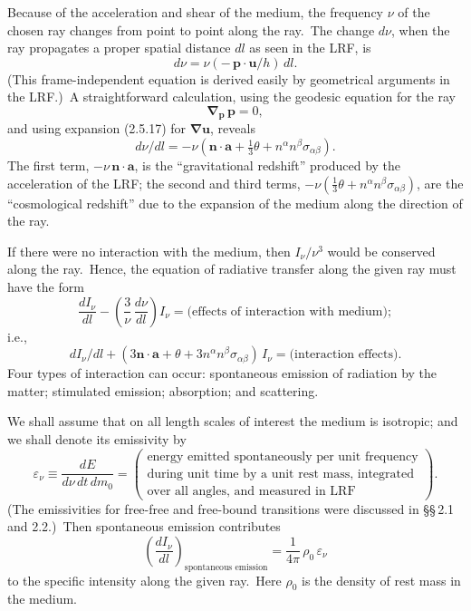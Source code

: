 Because of the acceleration and shear of the medium, the frequency
$\nu$ of the chosen ray changes from point to point along the ray.\ The change $d\nu$,
when the ray propagates a proper spatial distance $dl$ as seen in the LRF, is
%
\begin{equation}
d\nu = \nu(-\,\mathbf{p} \cdot \mathbf{u}/h)\,dl.
\tag{2.6.13}
\end{equation}
%
(This frame-independent equation is derived easily by geometrical arguments
in the LRF.)\ A straightforward calculation, using the geodesic equation for the
ray
%
\[
\boldsymbol{\nabla}_{\mathbf{p}}\,\mathbf{p} = 0,
\]
%
and using expansion (2.5.17) for $\boldsymbol{\nabla}\mathbf{u}$, reveals
%
\begin{equation}
d\nu/dl = -\nu(\mathbf{n} \cdot \mathbf{a} + \tfrac{1}{3}\theta
  + n^\alpha n^\beta \sigma_{\alpha\beta}).
\tag{2.6.14}
\end{equation}
%
The first term, $-\nu\,\mathbf{n} \cdot \mathbf{a}$, is the ``gravitational redshift'' produced by the acceleration
of the LRF; the second and third terms, $-\nu(\tfrac{1}{3}\theta + n^\alpha n^\beta \sigma_{\alpha\beta})$, are the
``cosmological redshift'' due to the expansion of the medium along the direction
of the ray.

If there were no interaction with the medium, then $I_\nu/\nu^3$ would be conserved
along the ray.\ Hence, the equation of radiative transfer along the given ray must
have the form
%
\begin{equation}
\frac{dI_\nu}{dl} - \left(\frac{3}{\nu}\,\frac{d\nu}{dl}\right) I_\nu
  = \text{(effects of interaction with medium)};
\tag{2.6.15}
\end{equation}
%
i.e.,
%
\[
dI_\nu/dl + (3\mathbf{n} \cdot \mathbf{a} + \theta
  + 3n^\alpha n^\beta \sigma_{\alpha\beta})\,I_\nu
  = \text{(interaction effects)}.
\]
%
Four types of interaction can occur: spontaneous emission of radiation by the
matter; stimulated emission; absorption; and scattering.

We shall assume that on all length scales of interest the medium is isotropic;
and we shall denote its emissivity by
%
\begin{equation}
\varepsilon_\nu \equiv \frac{dE}{d\nu\,dt\,dm_0}
  = \begin{pmatrix} \text{energy emitted spontaneously per unit frequency}\\
    \text{during unit time by a unit rest mass, integrated}\\
    \text{over all angles, and measured in LRF} \end{pmatrix}.
\tag{2.6.16}
\end{equation}
%
(The emissivities for free-free and free-bound transitions were discussed in \S\S\,2.1
and 2.2.)\ Then spontaneous emission contributes
%
\begin{equation}
\left(\frac{dI_\nu}{dl}\right)_{\!\text{spontaneous emission}}
  = \frac{1}{4\pi}\,\rho_0\,\varepsilon_\nu
\tag{2.6.17}
\end{equation}
%
to the specific intensity along the given ray.\ Here $\rho_0$ is the density of rest mass
in the medium.

